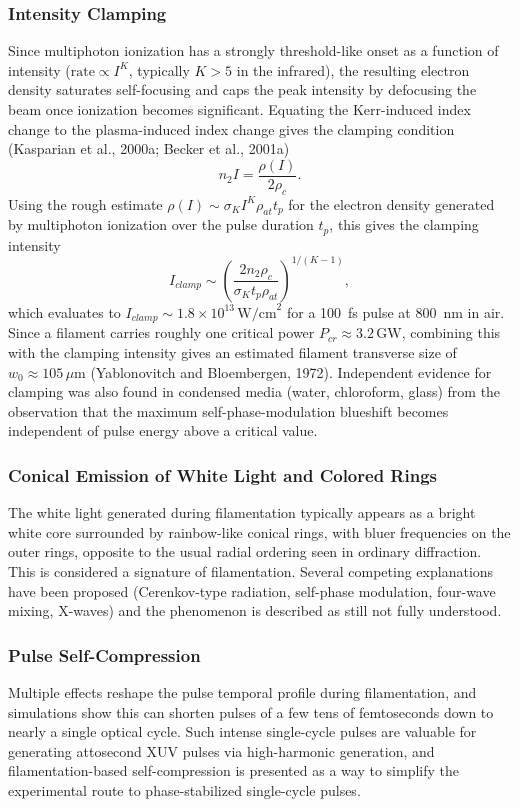 \documentclass[11pt,a4paper]{article}
\begin{document}
\subsubsection{Intensity Clamping}
Since multiphoton ionization has a strongly threshold-like onset as a function of intensity ($\text{rate}\propto I^K$, typically $K>5$ in the infrared), the resulting electron density saturates self-focusing and caps the peak intensity by defocusing the beam once ionization becomes significant. Equating the Kerr-induced index change to the plasma-induced index change gives the clamping condition (Kasparian et al., 2000a; Becker et al., 2001a)
\begin{equation}
n_2 I = \frac{\rho(I)}{2\rho_c}.
\end{equation}
Using the rough estimate $\rho(I)\sim\sigma_K I^K\rho_{at}t_p$ for the electron density generated by multiphoton ionization over the pulse duration $t_p$, this gives the clamping intensity
\begin{equation}
I_{clamp} \sim \left(\frac{2n_2\rho_c}{\sigma_K t_p\rho_{at}}\right)^{\!1/(K-1)},
\end{equation}
which evaluates to $I_{clamp}\sim1.8\times10^{13}\,\text{W/cm}^2$ for a 100~fs pulse at 800~nm in air. Since a filament carries roughly one critical power $P_{cr}\approx3.2\,\text{GW}$, combining this with the clamping intensity gives an estimated filament transverse size of $w_0\approx105\,\mu\text{m}$ (Yablonovitch and Bloembergen, 1972). Independent evidence for clamping was also found in condensed media (water, chloroform, glass) from the observation that the maximum self-phase-modulation blueshift becomes independent of pulse energy above a critical value.

\subsubsection{Conical Emission of White Light and Colored Rings}
The white light generated during filamentation typically appears as a bright white core surrounded by rainbow-like conical rings, with bluer frequencies on the outer rings, opposite to the usual radial ordering seen in ordinary diffraction. This is considered a signature of filamentation. Several competing explanations have been proposed (Cerenkov-type radiation, self-phase modulation, four-wave mixing, X-waves) and the phenomenon is described as still not fully understood.

\subsubsection{Pulse Self-Compression}
Multiple effects reshape the pulse temporal profile during filamentation, and simulations show this can shorten pulses of a few tens of femtoseconds down to nearly a single optical cycle. Such intense single-cycle pulses are valuable for generating attosecond XUV pulses via high-harmonic generation, and filamentation-based self-compression is presented as a way to simplify the experimental route to phase-stabilized single-cycle pulses.
\end{document}
